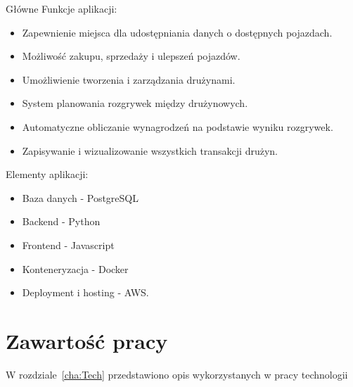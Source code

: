         Główne Funkcje aplikacji:
        \begin{itemize}
            \item Zapewnienie miejsca dla udostępniania danych o dostępnych pojazdach.
            \item Możliwość zakupu, sprzedaży i ulepszeń pojazdów.
            \item Umożliwienie tworzenia i zarządzania drużynami.
            \item System planowania rozgrywek między drużynowych.
            \item Automatyczne obliczanie wynagrodzeń na podstawie wyniku rozgrywek.
            \item Zapisywanie i wizualizowanie wszystkich transakcji drużyn.
        \end{itemize}%

        Elementy aplikacji:
        \begin{itemize}
            \item Baza danych - PostgreSQL
            \item Backend - Python
            \item Frontend - Javascript
            \item Konteneryzacja - Docker
            \item Deployment i hosting - AWS.
        \end{itemize}%


\section{Zawartość pracy}
\label{sec:zawartoscPracy}

W rozdziale~\ref{cha:Tech} przedstawiono opis wykorzystanych w pracy technologii